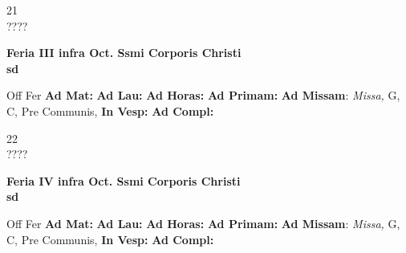\documentclass[10pt, openany]{book}
\begin{document}
    \begin{center}
        \begin{minipage}{3.5in}
            \vspace{2em}
            \begin{minipage}{0.5in}
                {\Huge 21} \\
                {\normalsize ????}
            \end{minipage}
            \begin{minipage}{3.0in}
                \textbf{ \large Feria III infra Oct. Ssmi Corporis Christi \\
                \textnormal{\normalsize sd}}

            \end{minipage}
            \begin{justify}Off Fer
                \textbf{Ad Mat: }
                \textbf{Ad Lau: }
                \textbf{Ad Horas: }
                \textbf{Ad Primam: }\textbf{Ad Missam}: \textit{Missa,} G, C, Pre Communis, 
                \textbf{In Vesp: }
                \textbf{Ad Compl: }
            \end{justify}
        \end{minipage}
    \end{center}

    \begin{center}
        \begin{minipage}{3.5in}
            \vspace{2em}
            \begin{minipage}{0.5in}
                {\Huge 22} \\
                {\normalsize ????}
            \end{minipage}
            \begin{minipage}{3.0in}
                \textbf{ \large Feria IV infra Oct. Ssmi Corporis Christi \\
                \textnormal{\normalsize sd}}

            \end{minipage}
            \begin{justify}Off Fer
                \textbf{Ad Mat: }
                \textbf{Ad Lau: }
                \textbf{Ad Horas: }
                \textbf{Ad Primam: }\textbf{Ad Missam}: \textit{Missa,} G, C, Pre Communis, 
                \textbf{In Vesp: }
                \textbf{Ad Compl: }
            \end{justify}
        \end{minipage}
    \end{center}
\end{document}
